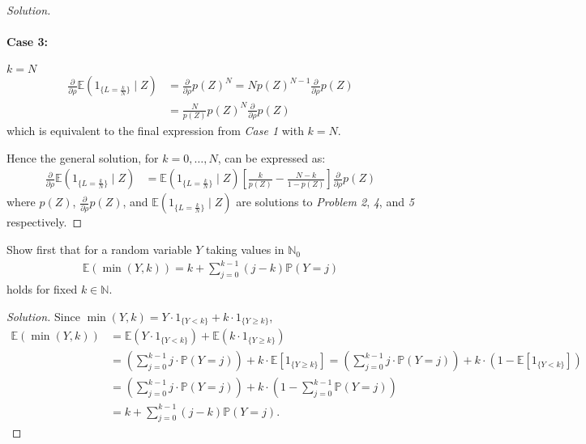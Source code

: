 \documentclass[10pt]{article}
\newcommand{\E}{\mathbb{E}}
\newcommand{\N}{\mathbb{N}}
\newenvironment{problem}[2][Problem]{\begin{trivlist}
\item[\hskip \labelsep {\bfseries #1}\hskip \labelsep {\bfseries #2.}]}{\end{trivlist}}
\begin{document}
\begin{proof}[Solution]
    \paragraph{Case 3:} $k = N$
    \begin{align*}
        \frac{\partial}{\partial \rho} \E \left( 1_{\{L = \frac{k}{N}\}} \mid Z \right) &= \frac{\partial}{\partial \rho} p(Z)^N = N p(Z)^{N-1} \frac{\partial}{\partial \rho} p(Z) \\
        &= \frac{N}{p(Z)} p(Z)^N \frac{\partial}{\partial \rho} p(Z)
    \end{align*}
    which is equivalent to the final expression from \textit{Case 1} with $k = N$.

    Hence the general solution, for $k = 0, \ldots, N$, can be expressed as:
    \begin{align*}
        \frac{\partial}{\partial \rho} \E \left( 1_{\{L = \frac{k}{N}\}} \mid Z \right) &= \E \left( 1_{\{L = \frac{k}{N}\}} \mid Z \right) \left[ \frac{k}{p(Z)} - \frac{N-k}{1 - p(Z)} \right] \frac{\partial}{\partial \rho} p(Z)
    \end{align*}
    where $p(Z)$, $\frac{\partial}{\partial \rho} p(Z)$, and $\E \left( 1_{\{L = \frac{k}{N}\}} \mid Z \right)$ are solutions to \textit{Problem 2}, \textit{4}, and \textit{5} respectively.
\end{proof}



\begin{problem}{7}
    Show first that for a random variable $Y$ taking values in $\N_0$
    \begin{align} \tag{4} \label{eqn:expectation_min}
        \E(\min(Y, k)) = k + \sum_{j=0}^{k-1} (j-k) \mathbb{P}(Y = j)
    \end{align}
    holds for fixed $k \in \N$.
\end{problem}

\begin{proof}[Solution]
    Since $\min(Y, k) = Y \cdot 1_{\{Y < k\}} + k \cdot 1_{\{Y \geq k\}}$,
    \begin{align*}
        \E(\min(Y, k)) &= \E(Y \cdot 1_{\{Y < k\}}) + \E(k \cdot 1_{\{Y \geq k\}}) \\
        &= \left( \sum_{j=0}^{k-1} j \cdot \mathbb{P}(Y = j) \right) + k \cdot \E[1_{\{Y \geq k\}}] = \left( \sum_{j=0}^{k-1} j \cdot \mathbb{P}(Y = j) \right) + k \cdot \left( 1 - \E[1_{\{Y < k\}}] \right) \\
        &= \left( \sum_{j=0}^{k-1} j \cdot \mathbb{P}(Y = j) \right) + k \cdot \left( 1 - \sum_{j=0}^{k-1} \mathbb{P}(Y = j) \right) \\
        &= k + \sum_{j=0}^{k-1} (j-k) \mathbb{P}(Y = j).
    \end{align*}
\end{proof}
\end{document}
